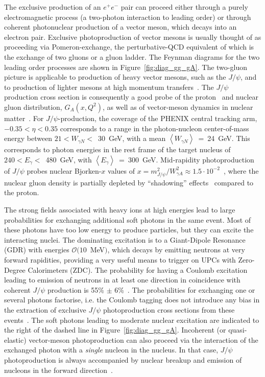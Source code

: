 \documentclass[dvipdfm]{elsart}
\def\mean#1{\ensuremath{\left<#1\right>}}
\def\fig#1{{Figure~\ref{#1}}}
\providecommand{\jpsi}{J/\psi}
\providecommand{\mean}[1]{\ensuremath{\left<#1\right>}}
\begin{document}
The exclusive production of an $e^+ e^-$ pair can proceed either through a 
purely electromagnetic process (a two-photon interaction to leading order) or 
through coherent photonuclear production of a vector meson, which decays into 
an electron pair. Exclusive photoproduction of vector mesons is usually 
thought of as proceeding via Pomeron-exchange, the perturbative-QCD 
equivalent of which is the exchange of two gluons or a gluon ladder. The 
Feynman diagrams for the two leading order processes are shown in 
\fig{fig:diag_gg_gA}. The two-gluon picture is applicable to production of 
heavy vector mesons, such as the $\jpsi$, and to production of lighter mesons 
at high momentum transfers~\cite{Mohrdieck:2002cf}. The $\jpsi$ production 
cross section is consequently a good probe of the proton~\cite{Ryskin:1995hz} 
and nuclear gluon distribution, $G_A(x,Q^2)$, as well as of vector-meson 
dynamics in nuclear matter~\cite{Frankfurt:1995jw,Frankfurt:2001db}. For 
$\jpsi$-production, the coverage of the PHENIX central tracking arm, $-0.35 < 
\eta < 0.35$ corresponds to a range in the photon-nucleon center-of-mass 
energy between $21 < W_{\gamma N} <$~30~GeV, with a mean $\mean{W_{\gamma 
N}}$~=~24~GeV. This corresponds to photon energies in the rest frame of the 
target nucleus of $240 < E_{\gamma} <$~480~GeV, with 
$\mean{E_{\gamma}}$~=~300~GeV. Mid-rapidity photoproduction of $\jpsi$ probes 
nuclear Bjorken-$x$ values of $x = m_{\jpsi}^2/W_{\gamma A}^2 \approx 1.5 
\cdot 10^{-2}$~\cite{Frankfurt:2001db}, where the nuclear gluon density is 
partially depleted by ``shadowing'' effects~\cite{Armesto:2006ph} compared to 
the proton.

The strong fields associated with heavy ions at high energies lead to large 
probabilities for exchanging additional soft photons in the same event. Most 
of these photons have too low energy to produce particles, but they can 
excite the interacting nuclei. The dominating excitation is to a Giant-Dipole 
Resonance (GDR) with energies $\mathcal{O}(10$~MeV$)$, which decays by 
emitting neutrons at very forward rapidities, providing a very useful means 
to trigger on UPCs with Zero-Degree Calorimeters (ZDC). 
The probability for having a Coulomb excitation leading to 
emission of neutrons in at least one direction in coincidence with coherent 
$\jpsi$ production is 55\% $\pm$ 6\%~\cite{Baltz:2002pp}. The probabilities 
for exchanging one or several photons factorise, i.e. the Coulomb tagging 
does not introduce any bias in the extraction of exclusive $\jpsi$ 
photoproduction cross sections from these events~\cite{Baur:2003ar}. The soft 
photons leading to moderate nuclear excitation are indicated to the right of 
the dashed line in \fig{fig:diag_gg_gA}. Incoherent (or quasi-elastic) 
vector-meson photoproduction can also proceed via the interaction of the 
exchanged photon with a {\it single} nucleon in the nucleus. In that case, 
$\jpsi$ photoproduction is always accompanied by nuclear breakup and emission 
of nucleons in the forward direction~\cite{Strikman:2005ze}.
\end{document}
